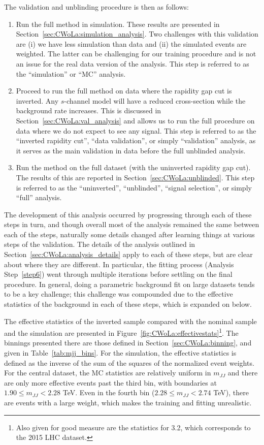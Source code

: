 The validation and unblinding procedure is then as follows:
\begin{enumerate}
\item Run the full method in simulation.  These results are presented in Section~\ref{sec:CWoLa:simulation_analysis}.  Two challenges with this validation are (i) we have less simulation than data and (ii) the simulated events are weighted.  The latter can be challenging for our training procedure and is not an issue for the real data version of the analysis. This step is referred to as the ``simulation'' or ``MC'' analysis.
\item Proceed to run the full method on data where the rapidity gap cut is inverted.  Any $s$-channel model will have a reduced cross-section while the background rate increases.  This is discussed in Section~\ref{sec:CWoLa:val_analysis} and allows us to run the full procedure on data where we do not expect to see any signal. This step is referred to as the ``inverted rapidity cut'', ``data validation'', or simply ``validation'' analysis, as it serves as the main validation in data before the full unblinded analysis.
\item Run the method on the full dataset (with the uninverted rapidity gap cut).  The results of this are reported in Section~\ref{sec:CWoLa:unblinded}. This step is referred to as the ``uninverted'', ``unblinded'', ``signal selection'', or simply ``full'' analysis.
\end{enumerate}

The development of this analysis occurred by progressing through each of these steps in turn, and though overall most of the analysis remained the same between each of the steps, naturally some details changed after learning things at various steps of the validation.
The details of the analysis outlined in Section~\ref{sec:CWoLa:analysis_details} apply to each of these steps, but are clear about where they are different.
In particular, the fitting process (Analysis Step~\ref{step6}) went through multiple iterations before settling on the final procedure.
In general, doing a parametric background fit on large datasets tends to be a key challenge;
this challenge was compounded due to the effective statistics of the background in each of these steps, which is expanded on below.

The effective statistics of the inverted sample compared with the nominal sample and the simulation are presented in Figure~\ref{fig:CWoLa:effectivestats}\footnote{Also given for good measure are the statistics for 3.2\ifb, which corresponds to the 2015 LHC dataset.}.
The binnings presented there are those defined in Section~\ref{sec:CWoLa:binning}, and given in Table~\ref{tab:mjj_bins}.
For the simulation, the effective statistics is defined as the inverse of the sum of the squares of the normalized event weights.
For the central dataset, the MC statistics are relatively uniform in $m_{JJ}$ and there are only more effective events past the third bin, with boundaries at $1.90 \le m_{JJ} < 2.28$ TeV.
Even in the fourth bin ($2.28 \le m_{JJ} < 2.74$ TeV), there are events with a large weight, which makes the training and fitting unrealistic.

